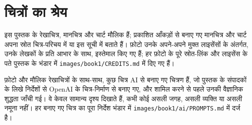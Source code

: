 \chapter*{चित्रों का श्रेय}

इस पुस्तक के रेखाचित्र, मानचित्र और चार्ट मौलिक हैं; प्रकाशित आँकड़ों से बनाए गए मानचित्र और
चार्ट अपना स्रोत चित्र-परिचय में या इस सूची में बताते हैं। फ़ोटो उनके अपने-अपने मुक्त लाइसेंसों के
अंतर्गत, उनके लेखकों के प्रति आभार के साथ, इस्तेमाल किए गए हैं; हर फ़ोटो के पूरे स्रोत-लिंक और
लाइसेंस के पते पुस्तक के भंडार में \texttt{images/book1/CREDITS.md} में दिए गए हैं।

\bigskip
फ़ोटो और मौलिक रेखाचित्रों के साथ-साथ, कुछ चित्र AI से बनाए गए चित्रण हैं, जो पुस्तक के
संपादकों के लिखे निर्देशों से OpenAI के चित्र-निर्माण से बनाए गए, और शामिल करने से पहले उनकी
वैज्ञानिक शुद्धता जाँची गई। वे केवल सामान्य दृश्य दिखाते हैं, कभी कोई असली जगह, असली व्यक्ति
या असली नमूना नहीं। हर बनाए गए चित्र का पूरा निर्देश भंडार में
\texttt{images/book1/ai/PROMPTS.md} में दर्ज है।


